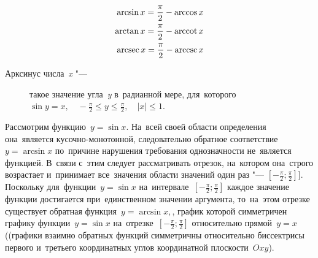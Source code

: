\documentclass[]{scrartcl}
\begin{document}
\begin{equation}\label{eq:arcfunctions-relationships}
	\begin{aligned}
	\arcsin x = \frac{\pi}{2} - \arccos x\\
	\arctan x = \frac{\pi}{2} - \operatorname{arccot} x\\
	\operatorname{arcsec} x = \frac{\pi}{2} - \operatorname{arccsc} x
	\end{aligned}
\end{equation}
%
\begin{description}
	\item[Арксинус числа~\textit{x} "---] такое значение угла~\textit{y} в~радианной мере, для~которого ${\displaystyle \sin y=x,\quad -{\frac {\pi }{2}}\leqslant y\leqslant {\frac {\pi }{2}},\quad |x|\leqslant 1}$.
\end{description}
Рассмотрим функцию~${\displaystyle y = \sin x}$. На~всей своей области определения она~является кусочно-монотонной, следовательно обратное соответствие~${\displaystyle y=\arcsin x}$ по~причине нарушения требования однозначности не~является функцией. В~связи с~этим следует рассматривать отрезок, на~котором она~строго возрастает и~принимает все~значения области значений один раз "--- ${\displaystyle \left[-{\frac {\pi }{2}};{\frac {\pi }{2}}\right]}$]. Поскольку для~функции~${\displaystyle y=\sin x}$ на~интервале~${\displaystyle \left[-{\frac {\pi }{2}};{\frac {\pi }{2}}\right]}$ каждое значение функции достигается при~единственном значении аргумента, то~на~этом отрезке существует обратная функция~${\displaystyle y=\arcsin x,}$, график которой симметричен графику функции~${\displaystyle y=\sin x}$ на~отрезке~${\displaystyle \left[-{\frac {\pi }{2}};{\frac {\pi }{2}}\right]}$ относительно прямой~${\displaystyle y = x}$ ((графики взаимно обратных функций симметричны относительно биссектрисы первого и~третьего координатных углов координатной плоскости~${\displaystyle Oxy}$).
\end{document}
